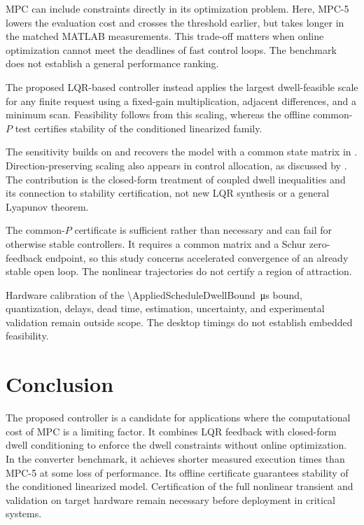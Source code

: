 \documentclass[pdflatex,iicol,sn-mathphys-ay]{sn-jnl}
\begin{document}
MPC can include constraints directly in its optimization problem. Here, MPC-5 lowers the evaluation cost and crosses the threshold earlier, but takes longer in the matched MATLAB measurements. This trade-off matters when online optimization cannot meet the deadlines of fast control loops. The benchmark does not establish a general performance ranking.

The proposed LQR-based controller instead applies the largest dwell-feasible scale for any finite request using a fixed-gain multiplication, adjacent differences, and a minimum scan. Feasibility follows from this scaling, whereas the offline common-$P$ test certifies stability of the conditioned linearized family.

The sensitivity builds on \cite{patino2010} and recovers the model with a common state matrix in \cite{marcolino2021}. Direction-preserving scaling also appears in control allocation, as discussed by \cite{nakamuraZimmerer2026directionPreserving}. The contribution is the closed-form treatment of coupled dwell inequalities and its connection to stability certification, not new LQR synthesis or a general Lyapunov theorem.

The common-$P$ certificate is sufficient rather than necessary and can fail for otherwise stable controllers. It requires a common matrix and a Schur zero-feedback endpoint, so this study concerns accelerated convergence of an already stable open loop. The nonlinear trajectories do not certify a region of attraction.

Hardware calibration of the \SI{\AppliedScheduleDwellBound}{\micro\second} bound, quantization, delays, dead time, estimation, uncertainty, and experimental validation remain outside scope. The desktop timings do not establish embedded feasibility.

\section{Conclusion}

The proposed controller is a candidate for applications where the computational cost of MPC is a limiting factor. It combines LQR feedback with closed-form dwell conditioning to enforce the dwell constraints without online optimization. In the converter benchmark, it achieves shorter measured execution times than MPC-5 at some loss of performance. Its offline certificate guarantees stability of the conditioned linearized model. Certification of the full nonlinear transient and validation on target hardware remain necessary before deployment in critical systems.
\end{document}
